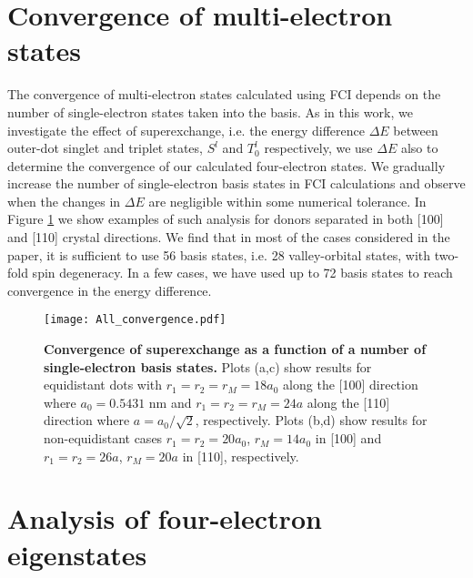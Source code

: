 \section{Convergence of multi-electron states}
The convergence of multi-electron states calculated using FCI depends on the number of single-electron states taken into the basis. As in this work, we investigate the effect of superexchange, i.e. the energy difference $\Delta E$ between outer-dot singlet and triplet states, $S^l$ and $T^l_0$ respectively, we use $\Delta E$ also to determine the convergence of our calculated four-electron states. We gradually increase the number of single-electron basis states in FCI calculations and observe when the changes in $\Delta E$ are negligible within some numerical tolerance. In Figure \ref{fig:convergence} we show examples of such analysis for donors separated in both [100] and [110] crystal directions. We find that in most of the cases considered in the paper, it is sufficient to use 56 basis states, i.e. 28 valley-orbital states, with two-fold spin degeneracy. In a few cases, we have used up to 72 basis states to reach convergence in the energy difference. 

\begin{figure}[htb!]
    \centering
    \texttt{[image: All\_convergence.pdf]}
    \caption[Convergence of superexchange as a function of a number of single-electron basis states]{\textbf{Convergence of superexchange as a function of a number of single-electron basis states.} Plots (a,c) show results for equidistant dots with $r_1=r_2=r_M=18a_0$ along the [100] direction where $a_0 = 0.5431$ nm and $r_1=r_2=r_M=24a$ along the [110] direction where $a = a_0/\sqrt{2}$, respectively. Plots (b,d) show results for non-equidistant cases $r_1=r_2=20a_0$, $r_M=14a_0$ in [100] and $r_1=r_2=26a$, $r_M=20a$ in [110], respectively.}
    \label{fig:convergence}
\end{figure}



\section{Analysis of four-electron eigenstates}



